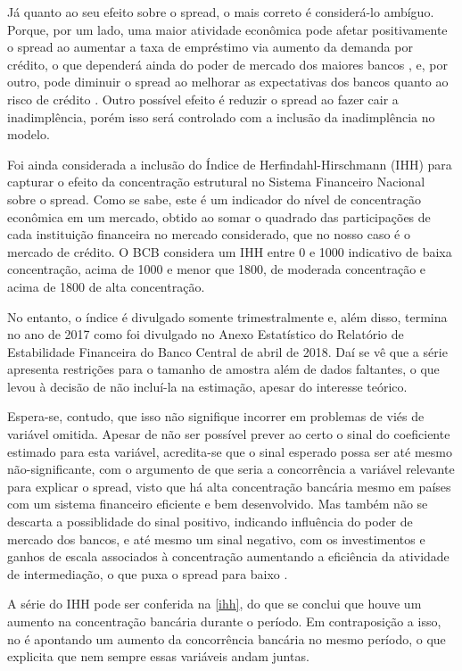 \documentclass[a4paper,
               article,
               12pt,
               openany,
               oneside,
               english,
               brazil]{abntex2}
\numberwithin{equation}{section}
\begin{document}
    Já quanto ao seu efeito sobre o spread, o mais correto é considerá-lo ambíguo. Porque, por um lado, uma maior atividade econômica pode afetar positivamente o spread ao aumentar a taxa de empréstimo via aumento da demanda por crédito, o que dependerá ainda do poder de mercado dos maiores bancos \textcite[626]{oreiro}, e, por outro, pode diminuir o spread ao melhorar as expectativas dos bancos quanto ao risco de crédito \textcite[24]{chaim}. Outro possível efeito é reduzir o spread ao fazer cair a inadimplência, porém isso será controlado com a inclusão da inadimplência no modelo.

    Foi ainda considerada a inclusão do Índice de Herfindahl-Hirschmann (IHH) para capturar o efeito da concentração estrutural no Sistema Financeiro Nacional sobre o spread. Como se sabe, este é um indicador do nível de concentração econômica em um mercado, obtido ao somar o quadrado das participações de cada instituição financeira no mercado considerado, que no nosso caso é o mercado de crédito. O BCB considera um IHH entre 0 e 1000 indicativo de baixa concentração, acima de 1000 e menor que 1800, de moderada concentração e acima de 1800 de alta concentração.
    
    No entanto, o índice é divulgado somente trimestralmente e, além disso, termina no ano de 2017 como foi divulgado no Anexo Estatístico do Relatório de Estabilidade Financeira do Banco Central de abril de 2018. Daí se vê que a série apresenta restrições para o tamanho de amostra além de dados faltantes, o que levou à decisão de não incluí-la na estimação, apesar do interesse teórico.

    Espera-se, contudo, que isso não signifique incorrer em problemas de viés de variável omitida. Apesar de não ser possível prever ao certo o sinal do coeficiente estimado para esta variável, acredita-se que o sinal esperado possa ser até mesmo não-significante, com o argumento de que seria a concorrência a variável relevante para explicar o spread, visto que há alta concentração bancária mesmo em países com um sistema financeiro eficiente e bem desenvolvido. Mas também não se descarta a possiblidade do sinal positivo, indicando influência do poder de mercado dos bancos, e até mesmo um sinal negativo, com os investimentos e ganhos de escala associados à concentração aumentando a eficiência da atividade de intermediação, o que puxa o spread para baixo \cite{reb2017}. 

    A série do IHH pode ser conferida na \autoref{ihh}, do que se conclui que houve um aumento na concentração bancária durante o período. Em contraposição a isso, no \textcite[11]{reb2017} é apontando um aumento da concorrência bancária no mesmo período, o que explicita que nem sempre essas variáveis andam juntas.
\end{document}
